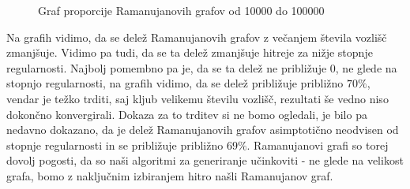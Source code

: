 \begin{figure}[H]
    \centering
    \caption{Graf proporcije Ramanujanovih grafov od 10000 do 100000}
\end{figure}
Na grafih vidimo, da se delež Ramanujanovih grafov z večanjem števila vozlišč zmanjšuje. Vidimo pa tudi, da se ta delež zmanjšuje hitreje za nižje stopnje regularnosti. Najbolj pomembno pa je, da se ta delež ne približuje \(0\), ne glede na stopnjo regularnosti, na grafih vidimo, da se delež približuje približno \(70\%\), vendar je težko trditi, saj kljub velikemu številu vozlišč, rezultati še vedno niso dokončno konvergirali. Dokaza za to trditev si ne bomo ogledali, je bilo pa nedavno dokazano, da je delež Ramanujanovih grafov asimptotično neodvisen od stopnje regularnosti in se približuje približno \(69\%\)\cite{huang2024ramanujanpropertyedgeuniversality}. Ramanujanovi grafi so torej dovolj pogosti, da so naši algoritmi za generiranje učinkoviti - ne glede na velikost grafa, bomo z naključnim izbiranjem hitro našli Ramanujanov graf.

